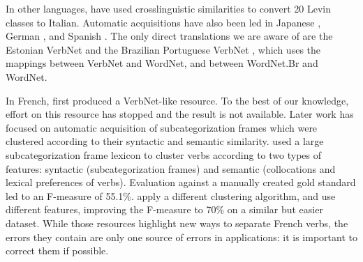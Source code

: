 In other languages, \cite{merlo2002multilingual} have used crosslinguistic
similarities to convert 20 Levin classes to Italian. Automatic acquisitions
have also been led in Japanese \citep{suzuki2009classifying}, German
\citep{im2006experiments}, and Spanish \citep{ferrer2004towards}. The
only direct translations we are aware of are the Estonian VerbNet
\citep{jentson2014verbnet} and the Brazilian Portuguese VerbNet
\citep{scarton2012towards}, which uses the mappings between VerbNet and
WordNet, and between WordNet.Br and WordNet.

In French, \cite{saintdizier1996constructing} first produced a VerbNet-like
resource. To the best of our knowledge, effort on this resource has stopped and
the result is not available. Later work has focused on automatic acquisition of
subcategorization frames which were clustered according to their syntactic and
semantic similarity. \cite{sun2010investigating} used a large
subcategorization frame lexicon \citep{messiant2010acquisition} to cluster
verbs according to two types of features: syntactic (subcategorization frames)
and semantic (collocations and lexical preferences of verbs). Evaluation
against a manually created gold standard led to an F-measure of 55.1\%.
\cite{falk2012classifying} apply a different clustering algorithm, and use
different features, improving the F-measure to 70\% on a similar but easier
dataset. While those resources highlight new ways to separate French verbs, the
errors they contain are only one source of errors in applications: it is
important to correct them if possible.


